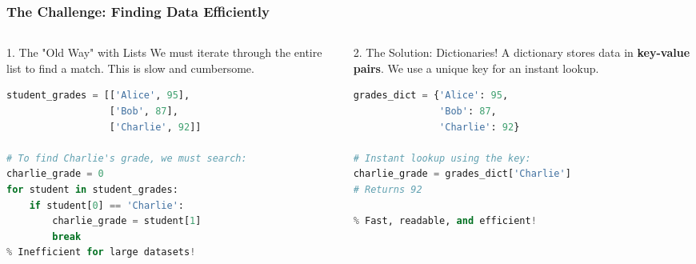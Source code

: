 \documentclass{beamer}
\begin{document}
\begin{frame}[fragile]
    \frametitle{The Challenge: Finding Data Efficiently}

    \begin{columns}[T]
        \begin{column}{0.5\textwidth}
            \begin{block}{1. The "Old Way" with Lists}
                We must iterate through the entire list to find a match. This is slow and cumbersome.
                
                \begin{lstlisting}[language=Python]
% The "old way" with lists
student_grades = [['Alice', 95], 
                  ['Bob', 87], 
                  ['Charlie', 92]]

# To find Charlie's grade, we must search:
charlie_grade = 0
for student in student_grades:
    if student[0] == 'Charlie':
        charlie_grade = student[1]
        break
% Inefficient for large datasets!
                \end{lstlisting}
            \end{block}
        \end{column}
        
        \begin{column}{0.5\textwidth}
            \begin{block}{2. The Solution: Dictionaries!}
                A dictionary stores data in \textbf{key-value pairs}. We use a unique key for an instant lookup.
                
                \begin{lstlisting}[language=Python]
% The "new way" with dictionaries
grades_dict = {'Alice': 95, 
               'Bob': 87, 
               'Charlie': 92}

# Instant lookup using the key:
charlie_grade = grades_dict['Charlie']
# Returns 92

% Fast, readable, and efficient!
                \end{lstlisting}
            \end{block}
        \end{column}
    \end{columns}
\end{frame}
\end{document}
